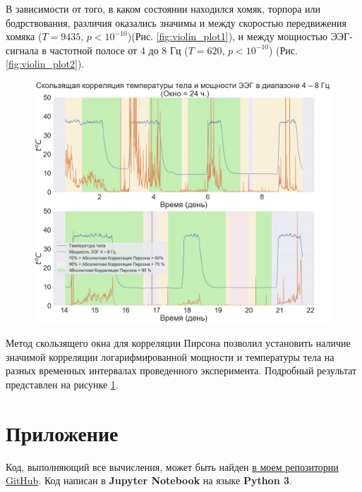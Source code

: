 \documentclass[12pt,a4paper,oneside]{article}
\begin{document}
В зависимости от того, в каком состоянии находился хомяк, торпора или бодрствования, различия оказались значимы и между скоростью передвижения хомяка ($T = 9435$, $p < 10^{-10}$)(Рис. \ref{fig:violin_plot1}), и между мощностью ЭЭГ-сигнала в частотной полосе от 4 до 8 Гц ($T = 620$, $p < 10^{-10}$) (Рис. \ref{fig:violin_plot2}). 

\begin{figure}[H]
\centering
\includegraphics[width=0.7\linewidth]{moving_correlation.png}
\caption{}\label{fig:moving_correlation}
\end{figure}

Метод скользящего окна для корреляции Пирсона позволил установить наличие значимой корреляции логарифмированной мощности и температуры тела на разных временных интервалах проведенного эксперимента. Подробный результат представлен на рисунке \ref{fig:moving_correlation}.

\section{Приложение}

Код, выполняющий все вычисления, может быть найден \href{https://github.com/BasilMinkov/Jupyter-Notebooks/blob/master/HamsterEEG.ipynb}{в моем репозитории GitHub}. Код написан в \textbf{Jupyter Notebook} на языке \textbf{Python 3}.




\end{document}
